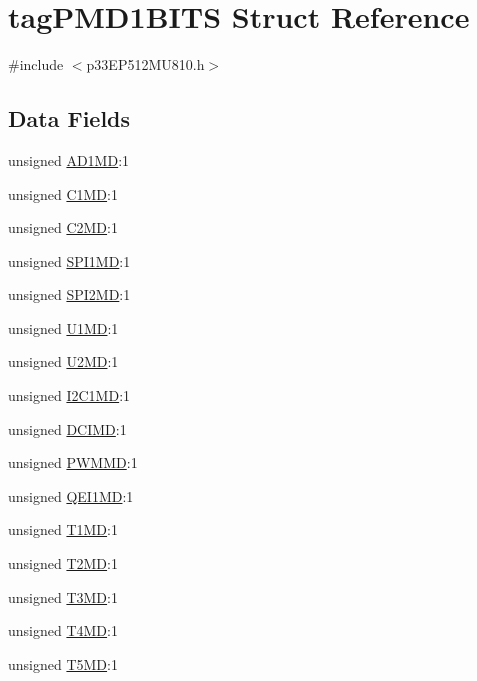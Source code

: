 \hypertarget{structtag_p_m_d1_b_i_t_s}{}\section{tag\+P\+M\+D1\+B\+I\+TS Struct Reference}
\label{structtag_p_m_d1_b_i_t_s}


{\ttfamily \#include $<$p33\+E\+P512\+M\+U810.\+h$>$}

\subsection*{Data Fields}
\begin{DoxyCompactItemize}
\item 
unsigned \hyperlink{structtag_p_m_d1_b_i_t_s_a747b185798245ac591f0648907151a60}{A\+D1\+MD}\+:1
\item 
unsigned \hyperlink{structtag_p_m_d1_b_i_t_s_a335da6bcf92acd49d2e867770251e66e}{C1\+MD}\+:1
\item 
unsigned \hyperlink{structtag_p_m_d1_b_i_t_s_ace6a3db4682831d0b70fbb27752af97a}{C2\+MD}\+:1
\item 
unsigned \hyperlink{structtag_p_m_d1_b_i_t_s_ad29e03b69ace854ffad5e288d0f2d26a}{S\+P\+I1\+MD}\+:1
\item 
unsigned \hyperlink{structtag_p_m_d1_b_i_t_s_a4de7f8631e66cb044c130cedf5c88a1d}{S\+P\+I2\+MD}\+:1
\item 
unsigned \hyperlink{structtag_p_m_d1_b_i_t_s_ac5c2e6756f360fa7d9a3995843ffd5d1}{U1\+MD}\+:1
\item 
unsigned \hyperlink{structtag_p_m_d1_b_i_t_s_afae6e78ad34918b7759cfe1a1c76581a}{U2\+MD}\+:1
\item 
unsigned \hyperlink{structtag_p_m_d1_b_i_t_s_a18959375c662d05b9b992142cc87d444}{I2\+C1\+MD}\+:1
\item 
unsigned \hyperlink{structtag_p_m_d1_b_i_t_s_acde33b1d641d6796246c35beb80303b8}{D\+C\+I\+MD}\+:1
\item 
unsigned \hyperlink{structtag_p_m_d1_b_i_t_s_adb632590cb864de8c431cfd8bb085687}{P\+W\+M\+MD}\+:1
\item 
unsigned \hyperlink{structtag_p_m_d1_b_i_t_s_a291ddfa859ca25a3b716a9766623f486}{Q\+E\+I1\+MD}\+:1
\item 
unsigned \hyperlink{structtag_p_m_d1_b_i_t_s_a25334ee20264f9d50602cb1b52a81043}{T1\+MD}\+:1
\item 
unsigned \hyperlink{structtag_p_m_d1_b_i_t_s_a1b9abf5d74fa45340b52eef8d981724b}{T2\+MD}\+:1
\item 
unsigned \hyperlink{structtag_p_m_d1_b_i_t_s_a51d3dfd0b1bf5ad1d71c766f25d748e3}{T3\+MD}\+:1
\item 
unsigned \hyperlink{structtag_p_m_d1_b_i_t_s_ad607c0f0a23aa62a6c74cb1ab38e0970}{T4\+MD}\+:1
\item 
unsigned \hyperlink{structtag_p_m_d1_b_i_t_s_a9813a6cb1716afcfc3ef6333904ecb50}{T5\+MD}\+:1
\end{DoxyCompactItemize}


